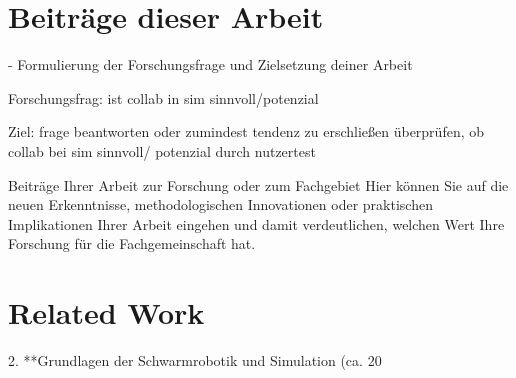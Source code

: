 \documentclass[german,version-2020-11]{uzl-thesis}
\begin{document}
  
    



  

  

  





\section{Beiträge dieser Arbeit}

%

- Formulierung der Forschungsfrage und Zielsetzung deiner Arbeit

      Forschungsfrag: ist collab in sim sinnvoll/potenzial

      Ziel: frage beantworten oder zumindest tendenz zu erschließen
        überprüfen, ob collab bei sim sinnvoll/ potenzial durch nutzertest


Beiträge Ihrer Arbeit zur Forschung oder zum Fachgebiet 
Hier können Sie auf die neuen Erkenntnisse, methodologischen Innovationen oder praktischen Implikationen Ihrer Arbeit 
eingehen und damit verdeutlichen, welchen Wert Ihre Forschung für die Fachgemeinschaft hat.


\section{Related Work}

%

2. **Grundlagen der Schwarmrobotik und Simulation (ca. 20%
\end{document}

